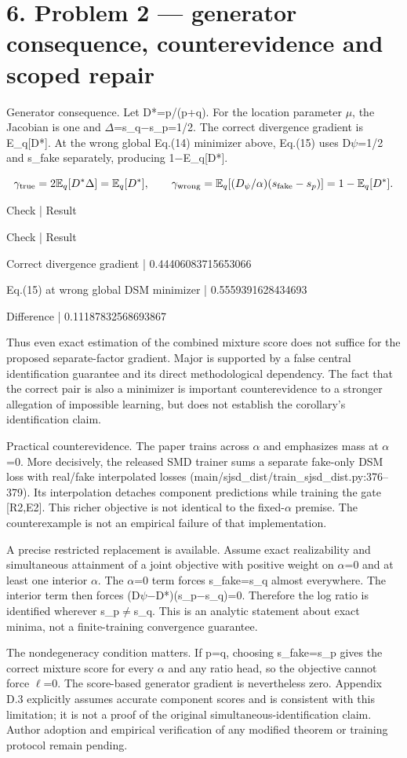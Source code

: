 \documentclass[10pt]{article}
\begin{document}
\section*{6. Problem 2 — generator consequence, counterevidence and scoped repair}
Generator consequence. Let D*=p/(p+q). For the location parameter \(\mu\), the Jacobian is one and \(\Delta\)=s\_q\(-\)s\_p=1/2. The correct divergence gradient is E\_q[D*]. At the wrong global Eq.(14) minimizer above, Eq.(15) uses D\(\psi\)=1/2 and s\_fake separately, producing 1\(-\)E\_q[D*].\par
\[\gamma_{\rm true}=2\mathbb E_q[D^*\Delta]=\mathbb E_q[D^*],
\qquad \gamma_{\rm wrong}=\mathbb E_q[(D_\psi/\alpha)(s_{\rm fake}-s_p)]
=1-\mathbb E_q[D^*].\]\par
Check | Result\par
Check | Result\par
Correct divergence gradient | 0.44406083715653066\par
Eq.(15) at wrong global DSM minimizer | 0.5559391628434693\par
Difference | 0.11187832568693867\par
Thus even exact estimation of the combined mixture score does not suffice for the proposed separate-factor gradient. Major is supported by a false central identification guarantee and its direct methodological dependency. The fact that the correct pair is also a minimizer is important counterevidence to a stronger allegation of impossible learning, but does not establish the corollary’s identification claim.\par
Practical counterevidence. The paper trains across \(\alpha\) and emphasizes mass at \(\alpha\)=0. More decisively, the released SMD trainer sums a separate fake-only DSM loss with real/fake interpolated losses (main/sjsd\_dist/train\_sjsd\_dist.py:376–379). Its interpolation detaches component predictions while training the gate [R2,E2]. This richer objective is not identical to the fixed-\(\alpha\) premise. The counterexample is not an empirical failure of that implementation.\par
A precise restricted replacement is available. Assume exact realizability and simultaneous attainment of a joint objective with positive weight on \(\alpha\)=0 and at least one interior \(\alpha\). The \(\alpha\)=0 term forces s\_fake=s\_q almost everywhere. The interior term then forces (D\(\psi\)\(-\)D*)(s\_p\(-\)s\_q)=0. Therefore the log ratio is identified wherever s\_p\(\ne\)s\_q. This is an analytic statement about exact minima, not a finite-training convergence guarantee.\par
The nondegeneracy condition matters. If p=q, choosing s\_fake=s\_p gives the correct mixture score for every \(\alpha\) and any ratio head, so the objective cannot force \(\ell\)=0. The score-based generator gradient is nevertheless zero. Appendix D.3 explicitly assumes accurate component scores and is consistent with this limitation; it is not a proof of the original simultaneous-identification claim. Author adoption and empirical verification of any modified theorem or training protocol remain pending.\par
\end{document}

